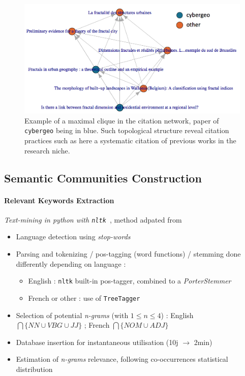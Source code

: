 \begin{figure}
\includegraphics[width=\textwidth]{figures/cybclic.png}
\caption[Example of clique in the citation network]{Example of a maximal clique in the citation network, paper of \texttt{cybergeo} being in blue. Such topological structure reveal citation practices such as here a systematic citation of previous works in the research niche.}
\label{fig:quantepistemo:cliques}
\end{figure}



\subsection{Semantic Communities Construction}



\paragraph{Relevant Keywords Extraction}


\textit{Text-mining in python with \texttt{nltk}~\cite{bird2006nltk}}, method adpated from
\cite{chavalarias2013phylomemetic}


\bigskip

\begin{itemize}
\item Language detection using \textit{stop-words}
\item Parsing and tokenizing / pos-tagging (word functions) / stemming done differently depending on language :
\begin{itemize}
\item English : \texttt{nltk} built-in pos-tagger, combined to a \emph{PorterStemmer}
\item French or other : use of \texttt{TreeTagger}~\cite{schmid1994probabilistic}
\end{itemize}
\item Selection of potential \textit{n-grams} (with $1 \leq n \leq 4$) : English $\bigcap \{NN \cup VBG \cup JJ \}$ ;  French  $\bigcap \{NOM \cup ADJ\}$
\item Database insertion for instantaneous utilisation (10j $\rightarrow$ 2min)
\item Estimation of \textit{n-grams} relevance, following co-occurrences statistical distribution
\end{itemize}



